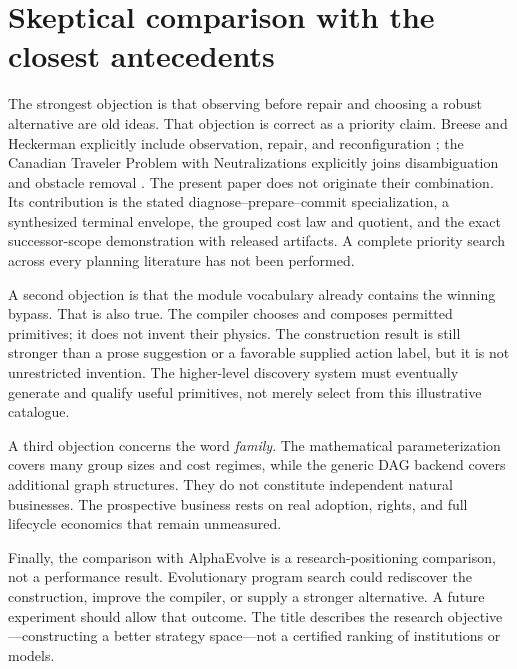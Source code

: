 \documentclass[11pt,letterpaper]{article}
\theoremstyle{remark}\newtheorem{remark}{Remark}[section]
\begin{document}
\section{Skeptical comparison with the closest antecedents}
The strongest objection is that observing before repair and choosing a robust alternative are old ideas. That objection is correct as a priority claim. Breese and Heckerman explicitly include observation, repair, and reconfiguration \citep{breese}; the Canadian Traveler Problem with Neutralizations explicitly joins disambiguation and obstacle removal \citep{traveler}. The present paper does not originate their combination. Its contribution is the stated diagnose--prepare--commit specialization, a synthesized terminal envelope, the grouped cost law and quotient, and the exact successor-scope demonstration with released artifacts. A complete priority search across every planning literature has not been performed.

A second objection is that the module vocabulary already contains the winning bypass. That is also true. The compiler chooses and composes permitted primitives; it does not invent their physics. The construction result is still stronger than a prose suggestion or a favorable supplied action label, but it is not unrestricted invention. The higher-level discovery system must eventually generate and qualify useful primitives, not merely select from this illustrative catalogue.

A third objection concerns the word \emph{family}. The mathematical parameterization covers many group sizes and cost regimes, while the generic DAG backend covers additional graph structures. They do not constitute independent natural businesses. The prospective business rests on real adoption, rights, and full lifecycle economics that remain unmeasured.

Finally, the comparison with AlphaEvolve is a research-positioning comparison, not a performance result. Evolutionary program search could rediscover the construction, improve the compiler, or supply a stronger alternative. A future experiment should allow that outcome. The title describes the research objective---constructing a better strategy space---not a certified ranking of institutions or models.
\end{document}
